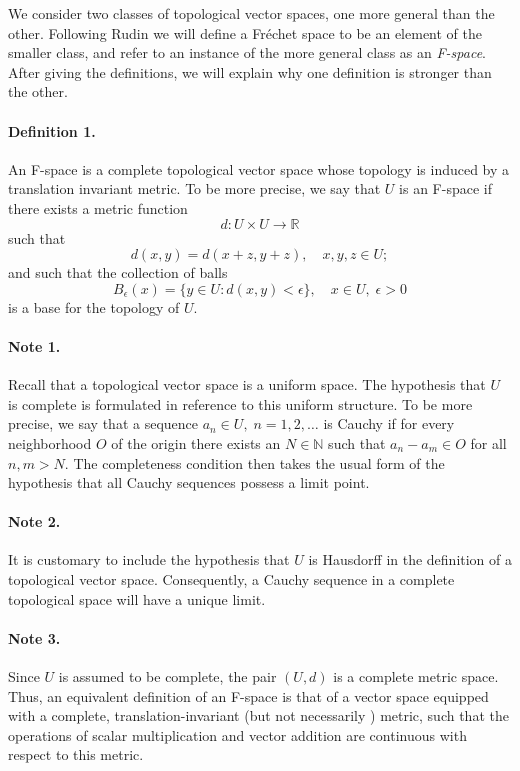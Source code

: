 \documentclass[12pt]{article}
\newcommand{\reals}{\mathbb{R}}
\newcommand{\natnums}{\mathbb{N}}
\begin{document}
We consider two classes of topological vector spaces, one more general
than the other. Following Rudin \cite{rudin_fa} we will define a Fr\'echet space
to be an element of the smaller class, and refer to an instance of the
more general class as an \emph{F-space}. After giving the
definitions, we will explain why one definition is stronger than the
other.


\paragraph{Definition 1.}
An F-space is a complete topological vector space whose topology is
induced by a translation invariant metric. To be more precise, we say
that $U$ is an F-space if there exists a metric function
$$d:U\times U\rightarrow \reals$$
such that $$d(x,y)=d(x+z,y+z),\quad x,y,z\in U;$$
and such that the collection of balls
$$B_\epsilon(x)=\{y\in U: d(x,y)<\epsilon\},\quad x\in U,\;
\epsilon>0$$
is a base for the topology of $U$.

\paragraph{Note 1.} Recall that a topological vector space is a uniform space.
The hypothesis that $U$ is complete is formulated in reference to this
uniform structure. To be more precise, we say that a sequence $a_n\in
U,\; n=1,2,\ldots$ is Cauchy if for every neighborhood $O$ of the
origin there exists an $N\in\natnums$ such that
$a_n-a_m\in O$ for all $n,m>N$. The completeness condition then takes
the usual form of the hypothesis that all Cauchy sequences possess a
limit point.

\paragraph{Note 2.} It is customary to include the hypothesis that $U$ is
Hausdorff in the definition of a topological vector space.
Consequently, a Cauchy sequence in a complete topological space
will have a unique limit.

\paragraph{Note 3.} Since $U$ is assumed to be complete, the pair
$(U,d)$ is a complete metric space. Thus, an equivalent definition of
an F-space is that of a vector space equipped with a complete, translation-invariant (but not necessarily ) metric, such that the operations of scalar
multiplication and vector addition are continuous with respect to this
metric.
\end{document}
